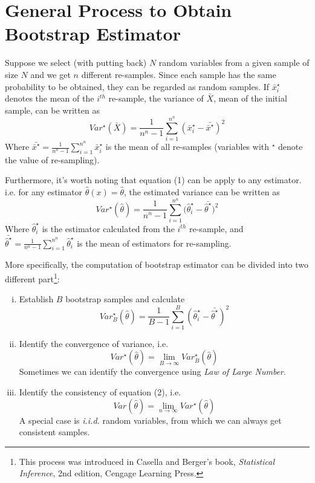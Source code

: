 \documentclass{journal}
\begin{document}
\section{General Process to Obtain Bootstrap Estimator}
\par Suppose we select (with putting back) $N$ random variables from a given sample of size $N$ and we get $n$ different re-samples. Since each sample has the same probability to be obtained, they can be regarded as random samples. If $ \bar{x}_i^\star $ denotes the mean of the $ i^{th} $ re-sample, the variance of $ \bar{X} $, mean of the initial sample, can be written as
\begin{equation}
Var^\star(\bar{X})=\frac{1}{n^n-1}\sum_{i=1}^{n^n}{\left(\bar{x}_i^\star-\bar{\bar{x}^\star}\right)^2}
\end{equation}
Where $ \bar{\bar{x}^\star}=\frac{1}{n^n-1}\sum_{i=1}^{n^n}{\bar{x}_i^\star} $ is the mean of all re-samples (variables with $^\star$ denote the value of re-sampling).
\par Furthermore, it's worth noting that equation (1) can be apply to any estimator. i.e. for any estimator $ \hat{\theta}(x)=\hat{\theta} $, the estimated variance can be written as
\begin{equation}
Var^\star(\hat{\theta})=\frac{1}{n^n-1}\sum_{i=1}^{n^n}({\hat{\theta}_i^\star-\bar{\hat{\theta}^\star})^2}
\end{equation}
Where $ \hat{\theta}_i^\star $ is the estimator calculated from the $ i^{th} $ re-sample, and $ \bar{\hat{\theta}^\star}=\frac{1}{n^n-1}\sum_{i=1}^{n^n}{\hat{\theta}_i^\star} $ is the mean of estimators for re-sampling.
\par More specifically, the computation of bootstrap estimator can be divided into two different part\footnote{This process was introduced in Casella and Berger's book, \textit{Statistical Inference}, 2nd edition, Cengage Learning Press.}:
\begin{enumerate}[i.]
\item Establish $ B $ bootstrap samples and calculate
\begin{equation}
Var_B^\star(\hat{\theta})=\frac{1}{B-1}\sum_{i=1}^{B}{(\hat{\theta}_i^\star-\bar{\hat{\theta}^\star})^2}
\end{equation}
\item Identify the convergence of variance, i.e.
\begin{equation}
Var^\star(\hat{\theta})=\lim_{B\rightarrow\infty}{Var_B^\star(\hat{\theta})}
\end{equation}
Sometimes we can identify the convergence using \emph{Law of Large Number}.
\item Identify the consistency of equation (2), i.e.
\begin{equation}
Var(\hat{\theta})=\lim_{n\rightarrow\infty}{Var^\star(\hat{\theta})}
\end{equation}
A special case is \emph{i.i.d.} random variables, from which we can always get consistent samples.
\end{enumerate}
\end{document}

